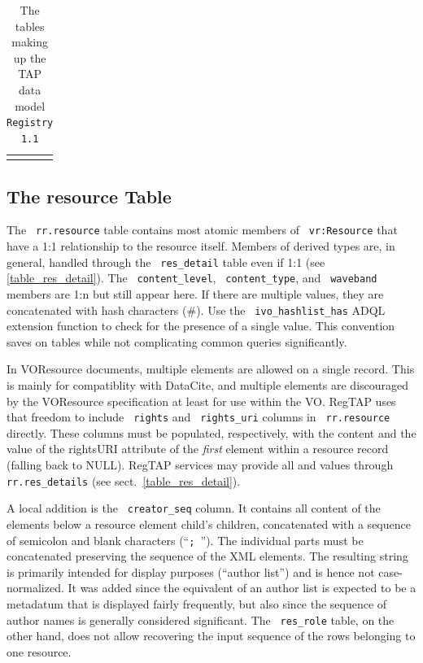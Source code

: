 \documentclass[11pt,a4paper]{ivoa}
\newcommand{\rtent}[1]{\texttt{\color{rtcolor} #1}}
\begin{document}
\begin{table}[t]
{\begin{tabular}{p{}p{}}
\sptablerule
\end{tabular}\hss}
\caption{The tables making up the TAP data model \texttt{Registry 1.1}}
\label{table:dm}
\end{table}



\subsection{The resource Table}

\label{table_resource}

The \rtent{rr.resource} table contains most atomic members of
\rtent{vr:Resource} that have a 1:1 relationship to the resource
itself.  Members of derived types are, in general, handled through 
the \rtent{res\_detail}
table even if 1:1 (see \ref{table_res_detail}).  The
\rtent{content\_level}, \rtent{content\_type}, and \rtent{waveband}
members are 1:n but still appear
here.  If there are multiple values, they are concatenated with hash
characters (\#).  Use the \rtent{ivo\_hashlist\_has} ADQL extension
function to check for the presence of a single value.  This convention
saves on tables while not complicating common queries significantly.

In VOResource documents, multiple  elements are allowed
on a single record.  This is mainly for compatiblity with DataCite, and
multiple  elements are discouraged by the VOResource
specification at least for use within the VO.  RegTAP uses that freedom
to include \rtent{rights} and \rtent{rights\_uri} columns in
\rtent{rr.resource} directly.  These columns must be populated,
respectively, with the content and the value of the rightsURI attribute
of the \emph{first}  element within a resource record
(falling back to NULL).  RegTAP services may provide all 
and  values through \rtent{rr.res\_details} (see
sect.~\ref{table_res_detail}).

A local addition is the \rtent{creator\_seq} column.  It contains
all content of the  elements below a resource element
 child's  children, concatenated with a
sequence of semicolon and blank characters (``\mbox{\texttt{; }}''). The
individual parts must be concatenated preserving the sequence of the XML
elements.  The resulting string is primarily intended for display
purposes (``author list'') and is hence not case-normalized.  It was
added since the equivalent of an author list is expected to be a
metadatum that is displayed fairly frequently, but also since the
sequence of author names is generally considered significant.  The
\rtent{res\_role} table, on the other hand, does not allow recovering
the input sequence of the rows belonging to one resource.
\end{document}
